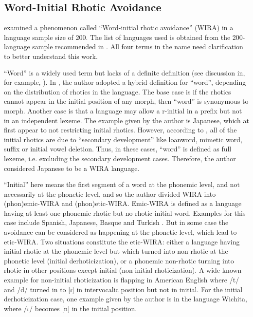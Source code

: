\subsection{Word-Initial Rhotic Avoidance}

\citet{labrune2021word} examined a phenomenon called ``Word-initial rhotic avoidance'' (WIRA) in a language sample size of 200. 
The list of languages used is obtained from the 200-language sample recommended in \citet{wals}. 
All four terms in the name need clarification to better understand this work. 

\par
``Word'' is a widely used term but lacks of a definite definition (see discussion in, for example, \citet{martin2017indeterminacy}). 
In \citet{labrune2021word}, the author adopted a hybrid definition for ``word'', depending on the distribution of rhotics in the language.
The base case is if the rhotics cannot appear in the initial position of any morph, then ``word'' is synonymous to morph.
Another case is that a language may allow a r-initial in a prefix but not in an independent lexeme.
The example given by the author is Japanese, which at first appear to not restricting initial rhotics.
However, according to \citet{labrune2021word}, all of the initial rhotics are due to ``secondary development'' like loanword, mimetic word, suffix or initial vowel deletion.
Thus, in these cases, ``word'' is defined as full lexeme, i.e. excluding the secondary development cases.
Therefore, the author considered Japanese to be a WIRA language.

\par
``Initial'' here means the first segment of a word at the phonemic level, and not necessarily at the phonetic level, and so the author divided  WIRA into (phon)emic-WIRA and (phon)etic-WIRA. 
Emic-WIRA is defined as a language having at least one phonemic rhotic but no rhotic-initial word.
Examples for this case include Spanish, Japanese, Basque and Turkish \citep{labrune2021word}. 
But in some case the avoidance can be considered as happening at the phonetic level, which lead to etic-WIRA. 
Two situations constitute the etic-WIRA: either a language having initial rhotic at the phonemic level but which turned into non-rhotic at the phonetic level (initial derhoticization), or a phonemic non-rhotic turning into rhotic in other positions except initial (non-initial rhoticization).
A wide-known example for non-initial rhoticization is flapping in American English where /t/ and /d/ turned in to [ɾ] in intervocalic position but not in initial.
For the initial derhoticization case, one example given by the author is in the language Wichita, where /ɾ/ becomes [n] in the initial position. 


